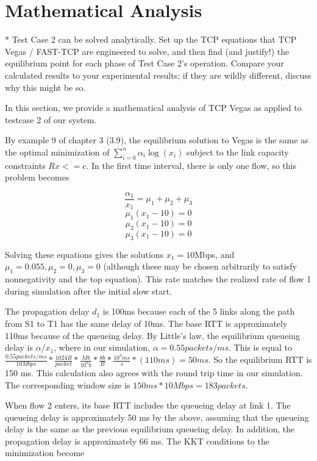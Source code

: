 

\section{Mathematical Analysis}

* Test Case 2 can be solved analytically. Set up
the TCP equations that TCP Vegas / FAST-TCP are
engineered to solve, and then find (and justify!)
the equilibrium point for each phase of Test Case
2's operation. Compare your calculated results to
your experimental results; if they are wildly
different, discuss why this might be so.

In this section, we provide a mathematical analysis of TCP Vegas as applied to testcase 2 of our system. 

By example 9 of chapter 3 (3.9), the equilibrium solution to Vegas is the same as the optimal minimization of $\displaystyle\sum\limits_{i=0}^n \alpha_i \log(x_i)$ subject to the link capacity constraints $Rx <= c$. In the first time interval, there is only one flow, so this problem becomes

$$\frac{\alpha_1}{x_1}=\mu_1 + \mu_2 + \mu_3$$
$$\mu_1 (x_1 - 10) = 0$$
$$\mu_2 (x_1 - 10) = 0$$
$$\mu_3 (x_1 - 10) = 0$$

Solving these equations gives the solutions $x_1=10$Mbps, and $\mu_1 = 0.055, \mu_2 = 0, \mu_3 = 0$ (although these may be chosen arbitrarily to satisfy nonnegativity and the top equation). This rate matches the realized rate of flow 1 during simulation after the initial slow start.

The propagation delay $d_1$ is 100ms because each of the 5 links along the path from S1 to T1 has the same delay of 10ms. The base RTT is approximately 110ms because of the queueing delay. By Little's law, the equilibrium queueing delay is $\alpha /  x_1$, where in our simulation, $\alpha = 0.55 packets/ms$. This is equal to $\frac{0.55 packets/ms}{10 Mbps} * \frac{1024 B}{packet} * \frac{Mb}{10^6 b} * \frac{8 b}{B} * \frac{10^3 ms}{s} * (110 ms) = 50 ms$. So the equilibrium RTT is 150 ms. This calculation also agrees with the round trip time in our simulation. The corresponding window size is $150ms * 10Mbps = 183 packets$.

When flow 2 enters, its base RTT includes the queueing delay at link 1. The queueing delay is approximately 50 ms by the above, assuming that the queueing delay is the same as the previous equilibrium queueing delay. In addition, the propagation delay is approximately 66 ms. The KKT conditions to the minimization become

